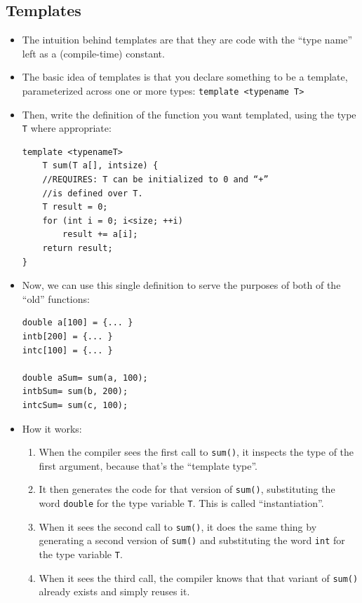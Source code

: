 \subsection{Templates}
\begin{itemize}
	\item The intuition behind templates are that they are code with the ``type name'' left as a (compile-time) constant.
	\item The basic idea of templates is that you declare something to be a template, parameterized across one or more types: \lstinline[style=C++]{template <typename T>}
	\item Then, write the definition of the function you want templated, using the type \lstinline[style=C++]{T} where appropriate:
\begin{lstlisting}[style=C++]
template <typenameT>
	T sum(T a[], intsize) {
	//REQUIRES: T can be initialized to 0 and “+”
	//is defined over T.
	T result = 0;
	for (int i = 0; i<size; ++i)
		result += a[i];
	return result;
}
\end{lstlisting}
	\item Now, we can use this single definition to serve the purposes of both of the ``old'' functions:
\begin{lstlisting}[style=C++]
double a[100] = {... }
intb[200] = {... }
intc[100] = {... }

double aSum= sum(a, 100);
intbSum= sum(b, 200);
intcSum= sum(c, 100);
\end{lstlisting}
	\item How it works:
	\begin{enumerate}
		\item When the compiler sees the first call to \lstinline[style=C++]{sum()}, it inspects the type of the first argument, because that's the ``template type''.
		\item It then generates the code for that version of \lstinline[style=C++]{sum()}, substituting the word \lstinline[style=C++]{double} for the type variable \lstinline[style=C++]{T}. This is called ``instantiation''.
		\item When it sees the second call to \lstinline[style=C++]{sum()}, it does the same thing by generating a second version of \lstinline[style=C++]{sum()} and substituting the word \lstinline[style=C++]{int} for the type variable \lstinline[style=C++]{T}.
		\item When it sees the third call, the compiler knows that that variant of \lstinline[style=C++]{sum()} already exists and simply reuses it.
	\end{enumerate}
\end{itemize}